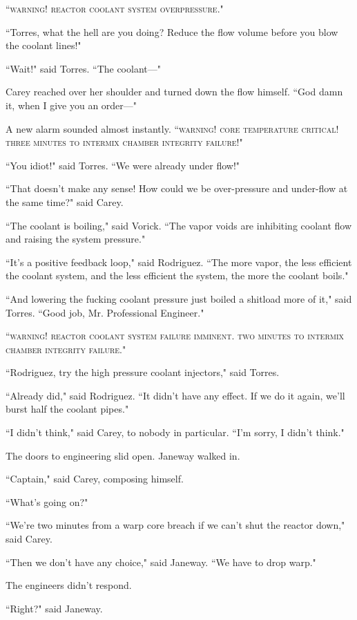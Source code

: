 \documentclass[twoside,letterpaper,12pt]{memoir}
\begin{document}
``\textsc{warning! reactor coolant system overpressure}."

``Torres, what the hell are you doing? Reduce the flow volume before you blow the coolant lines!"

``Wait!" said Torres. ``The coolant---"

Carey reached over her shoulder and turned down the flow himself. ``God damn it, when I give you an order---"

A new alarm sounded almost instantly. ``\textsc{warning! core temperature critical! three minutes to intermix chamber integrity failure!}"

``You idiot!" said Torres. ``We were already under flow!"

``That doesn't make any sense! How could we be over-pressure and under-flow at the same time?" said Carey.

``The coolant is boiling," said Vorick. ``The vapor voids are inhibiting coolant flow and raising the system pressure."

``It's a positive feedback loop," said Rodriguez. ``The more vapor, the less efficient the coolant system, and the less efficient the system, the more the coolant boils."

``And lowering the fucking coolant pressure just boiled a shitload more of it," said Torres. ``Good job, Mr. Professional Engineer."

``\textsc{warning! reactor coolant system failure imminent. two minutes to intermix chamber integrity failure}."

``Rodriguez, try the high pressure coolant injectors," said Torres.

``Already did," said Rodriguez. ``It didn't have any effect. If we do it again, we'll burst half the coolant pipes."

``I didn't think," said Carey, to nobody in particular. ``I'm sorry, I didn't think."

The doors to engineering slid open. Janeway walked in.

``Captain," said Carey, composing himself.

``What's going on?"

``We're two minutes from a warp core breach if we can't shut the reactor down," said Carey.

``Then we don't have any choice," said Janeway. ``We have to drop warp."

The engineers didn't respond.

``Right?" said Janeway.
\end{document}

